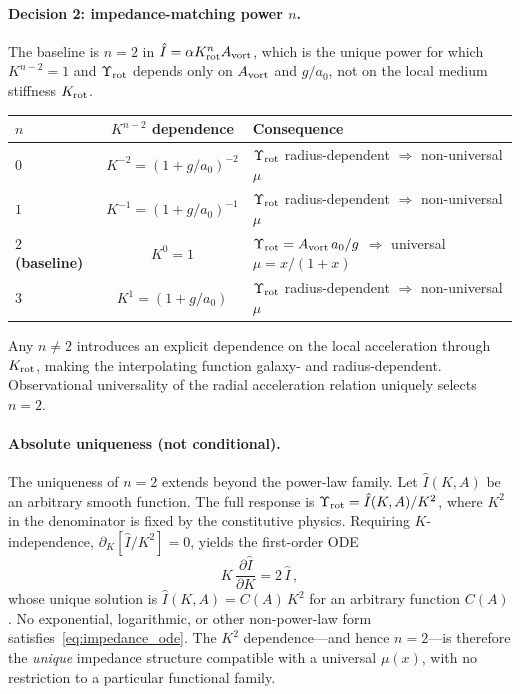 \documentclass[11pt]{article}
\begin{document}
\paragraph{Decision 2: impedance-matching power $n$.}
The baseline is $n=2$ in $\hat I=\alpha K_{\rm rot}^n A_{\rm vort}$,
which is the unique power for which $K^{n-2}=1$ and
$\Upsilon_{\rm rot}$ depends only on $A_{\rm vort}$ and $g/a_0$,
not on the local medium stiffness $K_{\rm rot}$.
\begin{center}
\begin{tabular}{@{}lcl@{}}
\toprule
$n$ & $K^{n-2}$ dependence & \textbf{Consequence} \\
\midrule
$0$ & $K^{-2}=(1+g/a_0)^{-2}$ &
  $\Upsilon_{\rm rot}$ radius-dependent $\Rightarrow$
  non-universal $\mu$ \\
$1$ & $K^{-1}=(1+g/a_0)^{-1}$ &
  $\Upsilon_{\rm rot}$ radius-dependent $\Rightarrow$
  non-universal $\mu$ \\
$2$ \textbf{(baseline)} & $K^{0}=1$ &
  $\Upsilon_{\rm rot}=A_{\rm vort}\,a_0/g$ $\Rightarrow$
  universal $\mu=x/(1+x)$ \\
$3$ & $K^{1}=(1+g/a_0)$ &
  $\Upsilon_{\rm rot}$ radius-dependent $\Rightarrow$
  non-universal $\mu$ \\
\bottomrule
\end{tabular}
\end{center}
Any $n\neq2$ introduces an explicit dependence on the local
acceleration through $K_{\rm rot}$, making the interpolating
function galaxy- and radius-dependent.  Observational universality
of the radial acceleration relation uniquely selects $n=2$.

\paragraph{Absolute uniqueness (not conditional).}
The uniqueness of $n=2$ extends beyond the power-law family.
Let $\hat I(K,A)$ be an arbitrary smooth function.  The full
response is $\Upsilon_{\rm rot}=\hat I(K,A)/K^2$, where
$K^2$ in the denominator is fixed by the constitutive physics.
Requiring $K$-independence,
$\partial_K[\hat I/K^2]=0$, yields the first-order ODE
\begin{equation}\label{eq:impedance_ode}
K\,\frac{\partial\hat I}{\partial K}=2\,\hat I\,,
\end{equation}
whose unique solution is $\hat I(K,A)=C(A)\,K^2$ for an
arbitrary function $C(A)$.  No exponential, logarithmic,
or other non-power-law form satisfies~\eqref{eq:impedance_ode}.
The $K^2$ dependence---and hence $n=2$---is therefore the
\emph{unique} impedance structure compatible with a universal
$\mu(x)$, with no restriction to a particular functional
family.
\end{document}
